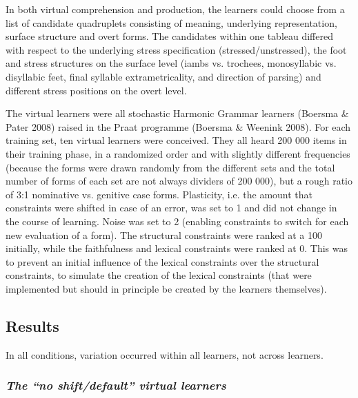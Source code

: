 \documentclass[a4paper]{article}
\begin{document}
In both virtual comprehension and production, the learners could choose from a list of candidate quadruplets consisting of meaning, underlying representation, surface structure and overt forms. The candidates within one tableau differed with respect to the underlying stress specification (stressed/unstressed), the foot and stress structures on the surface level (iambs vs. trochees, monosyllabic vs. disyllabic feet, final syllable extrametricality, and direction of parsing) and different stress positions on the overt level.

The virtual learners were all stochastic Harmonic Grammar learners (Boersma \& Pater 2008) raised in the Praat programme (Boersma \& Weenink 2008). For each training set, ten virtual learners were conceived. They all heard 200 000 items in their training phase, in a randomized order and with slightly different frequencies (because the forms were drawn randomly from the different sets and the total number of forms of each set are not always dividers of 200 000), but a rough ratio of 3:1 nominative vs. genitive case forms. Plasticity, i.e. the amount that constraints were shifted in case of an error, was set to 1 and did not change in the course of learning. Noise was set to 2 (enabling constraints to switch for each new evaluation of a form). The structural constraints were ranked at a 100 initially, while the faithfulness and lexical constraints were ranked at 0. This was to prevent an initial influence of the lexical constraints over the structural constraints, to simulate the creation of the lexical constraints (that were implemented but should in principle be created by the learners themselves).


\subsection{
Results}

 In all conditions, variation occurred within all learners, not across learners.

\subsubsection{
\textit{The “no shift}\textit{/default” virtual learners}}
\end{document}
